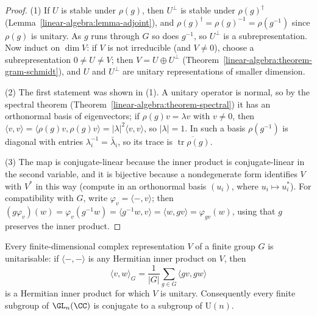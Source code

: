 \begin{proof}
(1) If $U$ is stable under $\rho(g)$, then $U^\perp$ is stable under $\rho(g)^\dagger$ (Lemma~\ref{linear-algebra:lemma-adjoint}), and $\rho(g)^\dagger = \rho(g)^{-1} = \rho(g^{-1})$ since $\rho(g)$ is
unitary. As $g$ runs through $G$ so does $g^{-1}$, so $U^\perp$ is a subrepresentation. Now induct on $\dim V$: if $V$ is not irreducible (and $V \neq 0$), choose a subrepresentation
$0 \neq U \neq V$; then $V = U \oplus U^\perp$ (Theorem~\ref{linear-algebra:theorem-gram-schmidt}), and $U$ and $U^\perp$ are unitary representations of smaller dimension.

(2) The first statement was shown in (1). A unitary operator is normal, so by the spectral theorem (Theorem~\ref{linear-algebra:theorem-spectral}) it has an orthonormal basis of
eigenvectors; if $\rho(g)v = \lambda v$ with $v \neq 0$, then $\langle v, v\rangle = \langle \rho(g)v, \rho(g)v\rangle = |\lambda|^2\langle v, v\rangle$, so $|\lambda| = 1$. In such a basis $\rho(g^{-1})$ is
diagonal with entries $\lambda_i^{-1} = \bar\lambda_i$, so its trace is $\overline{\operatorname{tr}\rho(g)}$.

(3) The map is conjugate-linear because the inner product is conjugate-linear in the second variable, and it is bijective because a nondegenerate form identifies $V$ with $V^*$ in this way
(compute in an orthonormal basis $(u_i)$, where $u_i \mapsto u_i^*$). For compatibility with $G$, write $\varphi_v = \langle -, v\rangle$; then
$(g\varphi_v)(w) = \varphi_v(g^{-1}w) = \langle g^{-1}w, v\rangle = \langle w, gv\rangle = \varphi_{gv}(w)$, using that $g$ preserves the inner product.
\end{proof}

\begin{theorem}\label{representation-theory:theorem-unitary-trick}
Every finite-dimensional complex representation $V$ of a finite group $G$ is unitarisable: if $\langle -, - \rangle$ is any Hermitian inner product on $V$, then
\[
\langle v, w\rangle_G = \frac{1}{|G|}\sum_{g \in G}\langle gv, gw\rangle
\]
is a Hermitian inner product for which $V$ is unitary. Consequently every finite subgroup of $\GL_n(\CC)$ is conjugate to a subgroup of $\mathrm{U}(n)$.
\end{theorem}

